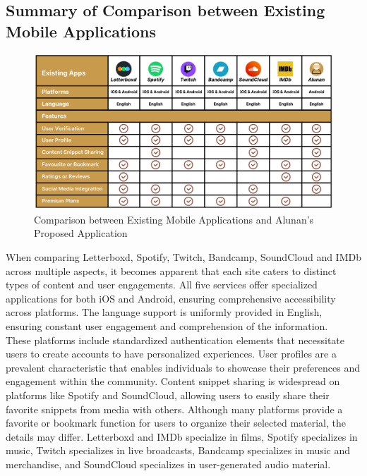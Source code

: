 \subsection{Summary of Comparison between Existing Mobile Applications}
\begin{figure}[h]
  \centering
  \includegraphics[width=1.0\linewidth]{mainmatter/images/appcompare1.png}
  \caption{Comparison between Existing Mobile Applications and Alunan's Proposed Application}
  \label{fig:myfig32}
\end{figure}

When comparing Letterboxd, Spotify, Twitch, Bandcamp, SoundCloud and IMDb across multiple aspects, it becomes apparent that each site caters to distinct types of content and user engagements. All five services offer specialized applications for both iOS and Android, ensuring comprehensive accessibility across platforms. The language support is uniformly provided in English, ensuring constant user engagement and comprehension of the information. \\

These platforms include standardized authentication elements that necessitate users to create accounts to have personalized experiences. User profiles are a prevalent characteristic that enables individuals to showcase their preferences and engagement within the community. Content snippet sharing is widespread on platforms like Spotify and SoundCloud, allowing users to easily share their favorite snippets from media with others. Although many platforms provide a favorite or bookmark function for users to organize their selected material, the details may differ. Letterboxd and IMDb specialize in films, Spotify specializes in music, Twitch specializes in live broadcasts, Bandcamp specializes in music and merchandise, and SoundCloud specializes in user-generated audio material. \pagebreak

